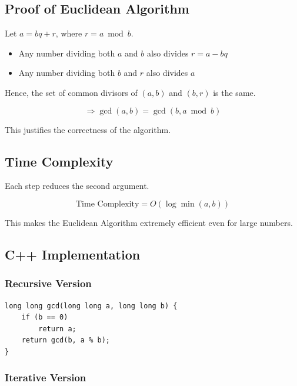 \documentclass[11pt]{article}
\begin{document}
\subsection{Proof of Euclidean Algorithm}

Let $a = bq + r$, where $r = a \bmod b$.

\begin{itemize}
    \item Any number dividing both $a$ and $b$ also divides $r = a - bq$
    \item Any number dividing both $b$ and $r$ also divides $a$
\end{itemize}

Hence, the set of common divisors of $(a, b)$ and $(b, r)$ is the same.

\[
\Rightarrow \gcd(a, b) = \gcd(b, a \bmod b)
\]

This justifies the correctness of the algorithm.

\subsection{Time Complexity}

Each step reduces the second argument.

\[
\text{Time Complexity} = O(\log \min(a, b))
\]

This makes the Euclidean Algorithm extremely efficient even for large numbers.

\subsection{C++ Implementation}

\subsubsection{Recursive Version}

\begin{lstlisting}
long long gcd(long long a, long long b) {
    if (b == 0)
        return a;
    return gcd(b, a % b);
}
\end{lstlisting}

\subsubsection{Iterative Version}
\end{document}

